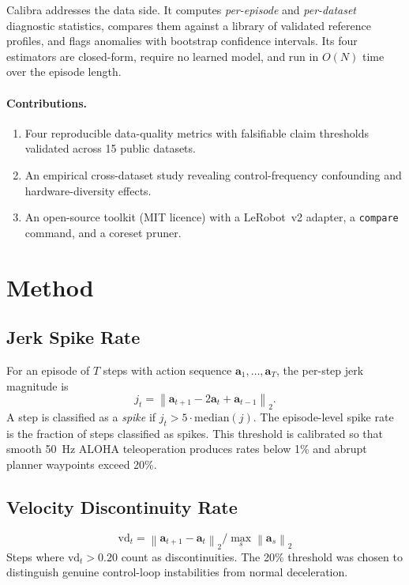 \documentclass[10pt,twocolumn]{article}
\begin{document}
Calibra addresses the data side. It computes \emph{per-episode} and
\emph{per-dataset} diagnostic statistics, compares them against a
library of validated reference profiles, and flags anomalies with
bootstrap confidence intervals. Its four estimators are closed-form,
require no learned model, and run in $O(N)$ time over the episode length.

\paragraph{Contributions.}
\begin{enumerate}
  \item Four reproducible data-quality metrics with falsifiable claim
        thresholds validated across 15 public datasets.
  \item An empirical cross-dataset study revealing control-frequency
        confounding and hardware-diversity effects.
  \item An open-source toolkit (MIT licence) with a LeRobot~v2 adapter,
        a \texttt{compare} command, and a coreset pruner.
\end{enumerate}

\section{Method}
\label{sec:method}

\subsection{Jerk Spike Rate}

For an episode of $T$ steps with action sequence
$\mathbf{a}_1,\ldots,\mathbf{a}_T$, the per-step jerk magnitude is
\[
  j_t = \left\| \mathbf{a}_{t+1} - 2\mathbf{a}_t + \mathbf{a}_{t-1} \right\|_2.
\]
A step is classified as a \emph{spike} if $j_t > 5 \cdot \mathrm{median}(j)$.
The episode-level spike rate is the fraction of steps classified as spikes.
This threshold is calibrated so that smooth 50~Hz ALOHA teleoperation produces
rates below 1\% and abrupt planner waypoints exceed 20\%.

\subsection{Velocity Discontinuity Rate}

\[
  \mathrm{vd}_t = \left\| \mathbf{a}_{t+1} - \mathbf{a}_t \right\|_2
    \big/ \max_s \left\| \mathbf{a}_s \right\|_2
\]
Steps where $\mathrm{vd}_t > 0.20$ count as discontinuities. The 20\%
threshold was chosen to distinguish genuine control-loop instabilities from
normal deceleration.
\end{document}

